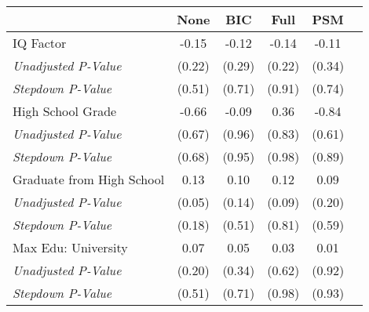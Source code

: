 \begin{tabular}{l c c c c c}
\toprule
 & None & BIC & Full & PSM \\
\midrule
IQ Factor & -0.15 & -0.12 & -0.14 & -0.11 \\
\quad \textit{Unadjusted P-Value} & (0.22) & (0.29) & (0.22) & (0.34) \\
\quad \textit{Stepdown P-Value} & (0.51) & (0.71) & (0.91) & (0.74) \\
High School Grade & -0.66 & -0.09 & 0.36 & -0.84 \\
\quad \textit{Unadjusted P-Value} & (0.67) & (0.96) & (0.83) & (0.61) \\
\quad \textit{Stepdown P-Value} & (0.68) & (0.95) & (0.98) & (0.89) \\
Graduate from High School & 0.13 & 0.10 & 0.12 & 0.09 \\
\quad \textit{Unadjusted P-Value} & (0.05) & (0.14) & (0.09) & (0.20) \\
\quad \textit{Stepdown P-Value} & (0.18) & (0.51) & (0.81) & (0.59) \\
Max Edu: University & 0.07 & 0.05 & 0.03 & 0.01 \\
\quad \textit{Unadjusted P-Value} & (0.20) & (0.34) & (0.62) & (0.92) \\
\quad \textit{Stepdown P-Value} & (0.51) & (0.71) & (0.98) & (0.93) \\
\bottomrule
\end{tabular}

